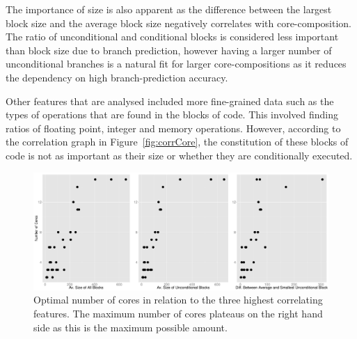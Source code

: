 The importance of size is also apparent as the difference between the largest block size and the average block size negatively correlates with core-composition.
The ratio of unconditional and conditional blocks is considered less important than block size due to branch prediction, however having a larger number of unconditional branches is a natural fit for larger core-compositions as it reduces the dependency on high branch-prediction accuracy.

Other features that are analysed included more fine-grained data such as the types of operations that are found in the blocks of code.
This involved finding ratios of floating point, integer and memory operations.
However, according to the correlation graph in Figure~\ref{fig:corrCore}, the constitution of these blocks of code is not as important as their size or whether they are conditionally executed.


\begin{figure}[t]
  \center
  \includegraphics[width=1\textwidth]{streamit-paper/graphics/lineargraphs.pdf}
  \caption{Optimal number of cores in relation to the three highest correlating features. The maximum number of cores plateaus on the right hand side as this is the maximum possible amount.}\label{fig:maxav}
\end{figure}

